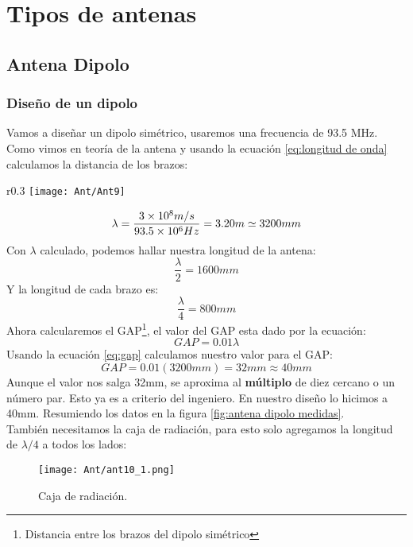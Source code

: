 \documentclass[
	12pt, %
	fleqn, %
	a4paper, %
	oneside, %
]{LegrandOrangeBook}
\begin{document}
\chapter{Tipos de antenas}
\section{Antena Dipolo}
\subsection{Diseño de un dipolo}
Vamos a diseñar un dipolo simétrico, usaremos una frecuencia de 93.5 MHz. Como vimos en teoría de la antena y usando la ecuación \ref{eq:longitud de onda} calculamos la distancia de los brazos:
\begin{wrapfigure}{r}{0.3\linewidth}
	\centering
    \texttt{[image: Ant/Ant9]}
  \caption{Longitudes del dipolo.}
  \label{fig:antena dipolo medidas}
\end{wrapfigure}
\begin{displaymath}
\lambda=\frac{3\times 10^{8}m/s}{93.5\times 10^{6}Hz}=3.20 m\simeq 3200mm
\end{displaymath}
Con $\lambda$ calculado, podemos hallar nuestra longitud de la antena:
\begin{displaymath}
\frac{\lambda}{2}=1600mm
\end{displaymath}
Y la longitud de cada brazo es:
\begin{displaymath}
\frac{\lambda}{4}=800mm
\end{displaymath}
Ahora calcularemos el GAP\footnote{Distancia entre los brazos del dipolo simétrico}, el valor del GAP esta dado por la ecuación:
\begin{equation}
GAP=0.01\lambda
\label{eq:gap}
\end{equation}
Usando la ecuación \ref{eq:gap} calculamos nuestro valor para el GAP:
\begin{displaymath}
GAP=0.01(3200mm)=32mm\approx 40mm
\end{displaymath}
Aunque el valor nos salga 32mm, se aproxima al \textbf{múltiplo} de diez cercano o un número par. Esto ya es a criterio del ingeniero. En nuestro diseño lo hicimos a 40mm.
Resumiendo los datos en la figura \ref{fig:antena dipolo medidas}.\\
También necesitamos la caja de radiación, para esto solo agregamos la longitud de $\lambda/4$ a todos los lados:
\begin{figure}[H]
\centering
\texttt{[image: Ant/ant10\_1.png]}
\caption{Caja de radiación.}
\end{figure}
\end{document}

